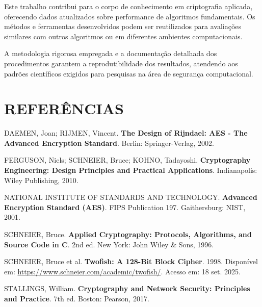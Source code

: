 \documentclass[12pt,a4paper,oneside]{article}
\begin{document}
Este trabalho contribui para o corpo de conhecimento em criptografia aplicada, oferecendo dados atualizados sobre performance de algoritmos fundamentais. Os métodos e ferramentas desenvolvidos podem ser reutilizados para avaliações similares com outros algoritmos ou em diferentes ambientes computacionais.

A metodologia rigorosa empregada e a documentação detalhada dos procedimentos garantem a reprodutibilidade dos resultados, atendendo aos padrões científicos exigidos para pesquisas na área de segurança computacional.

\section{REFERÊNCIAS}

DAEMEN, Joan; RIJMEN, Vincent. \textbf{The Design of Rijndael: AES - The Advanced Encryption Standard}. Berlin: Springer-Verlag, 2002.

FERGUSON, Niels; SCHNEIER, Bruce; KOHNO, Tadayoshi. \textbf{Cryptography Engineering: Design Principles and Practical Applications}. Indianapolis: Wiley Publishing, 2010.

NATIONAL INSTITUTE OF STANDARDS AND TECHNOLOGY. \textbf{Advanced Encryption Standard (AES)}. FIPS Publication 197. Gaithersburg: NIST, 2001.

SCHNEIER, Bruce. \textbf{Applied Cryptography: Protocols, Algorithms, and Source Code in C}. 2nd ed. New York: John Wiley \& Sons, 1996.

SCHNEIER, Bruce et al. \textbf{Twofish: A 128-Bit Block Cipher}. 1998. Disponível em: \url{https://www.schneier.com/academic/twofish/}. Acesso em: 18 set. 2025.

STALLINGS, William. \textbf{Cryptography and Network Security: Principles and Practice}. 7th ed. Boston: Pearson, 2017.
\end{document}
